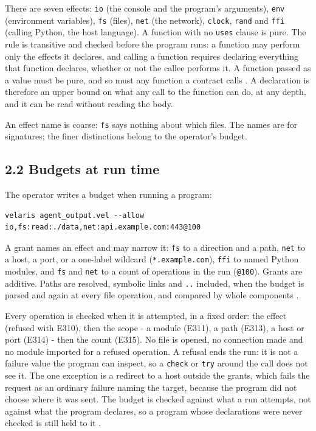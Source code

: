 \documentclass[
]{article}
\begin{document}
There are seven effects: \texttt{io} (the console and the program's
arguments), \texttt{env} (environment variables), \texttt{fs} (files),
\texttt{net} (the network), \texttt{clock}, \texttt{rand} and
\texttt{ffi} (calling Python, the host language). A function with no
\texttt{uses} clause is pure. The rule is transitive and checked before
the program runs: a function may perform only the effects it declares,
and calling a function requires declaring everything that function
declares, whether or not the callee performs it. A function passed as a
value must be pure, and so must any function a contract calls
\citep[section 3.2]{velaris_spec}. A declaration is therefore an upper
bound on what any call to the function can do, at any depth, and it can
be read without reading the body.

An effect name is coarse: \texttt{fs} says nothing about which files.
The names are for signatures; the finer distinctions belong to the
operator's budget.

\subsection{2.2 Budgets at run time}\label{budgets-at-run-time}

The operator writes a budget when running a program:

\begin{verbatim}
velaris agent_output.vel --allow io,fs:read:./data,net:api.example.com:443@100
\end{verbatim}

A grant names an effect and may narrow it: \texttt{fs} to a direction
and a path, \texttt{net} to a host, a port, or a one-label wildcard
(\texttt{*.example.com}), \texttt{ffi} to named Python modules, and
\texttt{fs} and \texttt{net} to a count of operations in the run
(\texttt{@100}). Grants are additive. Paths are resolved, symbolic links
and \texttt{..} included, when the budget is parsed and again at every
file operation, and compared by whole components \citep[sections 4 and
5]{velaris_spec}.

Every operation is checked when it is attempted, in a fixed order: the
effect (refused with E310), then the scope - a module (E311), a path
(E313), a host or port (E314) - then the count (E315). No file is
opened, no connection made and no module imported for a refused
operation. A refusal ends the run: it is not a failure value the program
can inspect, so a \texttt{check} or \texttt{try} around the call does
not see it. The one exception is a redirect to a host outside the
grants, which fails the request as an ordinary failure naming the
target, because the program did not choose where it was sent. The budget
is checked against what a run attempts, not against what the program
declares, so a program whose declarations were never checked is still
held to it \citep[section 6]{velaris_spec}.
\end{document}
